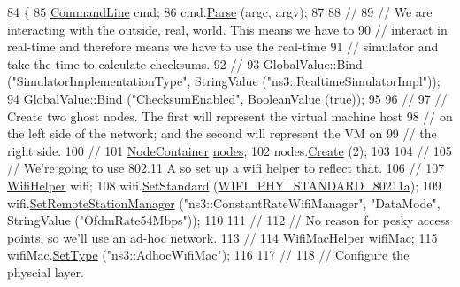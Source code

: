 \begin{DoxyCode}
84 \{
85   \hyperlink{classns3_1_1CommandLine}{CommandLine} cmd;
86   cmd.\hyperlink{classns3_1_1CommandLine_a5c10b85b3207e5ecb48d907966923156}{Parse} (argc, argv);
87 
88   \textcolor{comment}{//}
89   \textcolor{comment}{// We are interacting with the outside, real, world.  This means we have to }
90   \textcolor{comment}{// interact in real-time and therefore means we have to use the real-time}
91   \textcolor{comment}{// simulator and take the time to calculate checksums.}
92   \textcolor{comment}{//}
93   GlobalValue::Bind (\textcolor{stringliteral}{"SimulatorImplementationType"}, StringValue (\textcolor{stringliteral}{"ns3::RealtimeSimulatorImpl"}));
94   GlobalValue::Bind (\textcolor{stringliteral}{"ChecksumEnabled"}, \hyperlink{classns3_1_1BooleanValue}{BooleanValue} (\textcolor{keyword}{true}));
95 
96   \textcolor{comment}{//}
97   \textcolor{comment}{// Create two ghost nodes.  The first will represent the virtual machine host}
98   \textcolor{comment}{// on the left side of the network; and the second will represent the VM on }
99   \textcolor{comment}{// the right side.}
100   \textcolor{comment}{//}
101   \hyperlink{classns3_1_1NodeContainer}{NodeContainer} \hyperlink{visualizer-ideas_8txt_a3e1b3808014a2c68ab0cd0182e041be2}{nodes};
102   nodes.\hyperlink{classns3_1_1NodeContainer_a787f059e2813e8b951cc6914d11dfe69}{Create} (2);
103 
104   \textcolor{comment}{//}
105   \textcolor{comment}{// We're going to use 802.11 A so set up a wifi helper to reflect that.}
106   \textcolor{comment}{//}
107   \hyperlink{classns3_1_1WifiHelper}{WifiHelper} wifi;
108   wifi.\hyperlink{classns3_1_1WifiHelper_aa54f3e61527ef8de318d310045bc5dfd}{SetStandard} (\hyperlink{group__wifi_gga1299834f4e1c615af3ca738033b76a49a22db1e8022db2c3450414b86c77b11e4}{WIFI\_PHY\_STANDARD\_80211a});
109   wifi.\hyperlink{classns3_1_1WifiHelper_a3d01b178aeb2de246ab5a3aa5638ce24}{SetRemoteStationManager} (\textcolor{stringliteral}{"ns3::ConstantRateWifiManager"}, \textcolor{stringliteral}{"DataMode"}, 
      StringValue (\textcolor{stringliteral}{"OfdmRate54Mbps"}));
110 
111   \textcolor{comment}{//}
112   \textcolor{comment}{// No reason for pesky access points, so we'll use an ad-hoc network.}
113   \textcolor{comment}{//}
114   \hyperlink{classns3_1_1WifiMacHelper}{WifiMacHelper} wifiMac;
115   wifiMac.\hyperlink{classns3_1_1WifiMacHelper_a382d8df76a1dd7007179d1963b4b6bc6}{SetType} (\textcolor{stringliteral}{"ns3::AdhocWifiMac"});
116 
117   \textcolor{comment}{//}
118   \textcolor{comment}{// Configure the physcial layer.}

\end{DoxyCode}
